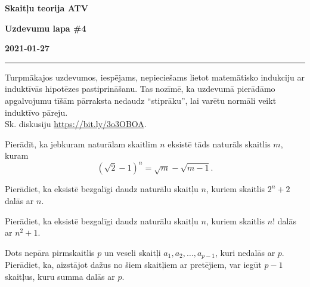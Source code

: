 \documentclass[a4paper,12pt]{article}
\begin{document}
\clearpage
\begin{center}
\parbox{3.5cm}{\flushleft\bf Skaitļu teorija \newline ATV} \hfill {\bf\LARGE Uzdevumu lapa \#4} \hfill \parbox{3.5cm}{\flushright\bf 2021-01-27} %
\end{center}

\hrule




\vspace{20pt}
Turpmākajos uzdevumos, iespējams, nepieciešams 
lietot matemātisko indukciju ar induktīvās hipotēzes pastiprināšanu. 
Tas nozīmē, ka uzdevumā pierādāmo apgalvojumu tīšām pārraksta nedaudz ``stiprāku'', 
lai varētu normāli veikt induktīvo pāreju.\\
Sk. diskusiju \url{https://bit.ly/3o3OBOA}.


\vspace{10pt}
\begin{problem}
Pierādīt, ka jebkuram naturālam skaitlim $n$ eksistē tāds naturāls skaitlis $m$, kuram
\[ \left( \sqrt{2} - 1 \right)^n = \sqrt{m} - \sqrt{m-1}. \]
\end{problem}


\vspace{10pt}
\begin{problem}
Pierādiet, ka eksistē bezgalīgi daudz naturālu skaitļu $n$, kuriem skaitlis $2^n+2$  dalās ar $n$.
\end{problem}



\vspace{10pt}
\begin{problem}
Pierādiet, ka eksistē bezgalīgi daudz naturālu skaitļu $n$, kuriem skaitlis $n!$ dalās ar $n^2 + 1$.
\end{problem}



\vspace{10pt}
\begin{problem}
Dots nepāra pirmskaitlis $p$ un veseli skaitļi $a_1,a_2,\ldots,a_{p-1}$, kuri nedalās ar $p$. 
Pierādiet, ka, aizstājot dažus no šiem skaitļiem ar pretējiem, var iegūt $p-1$ skaitļus, kuru summa dalās ar $p$.
\end{problem}
\end{document}
